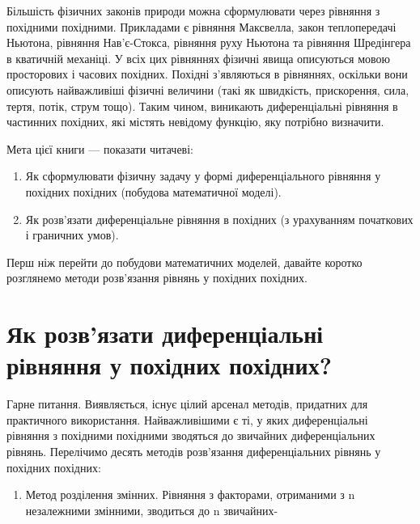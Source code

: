 \documentclass[
  ukrainian,
]{article}
\providecommand{\tightlist}{%
  \setlength{\itemsep}{0pt}\setlength{\parskip}{0pt}}
\begin{document}
Більшість фізичних законів природи можна сформулювати через рівняння з
похідними похідними. Прикладами є рівняння Максвелла, закон
теплопередачі Ньютона, рівняння Нав'є-Стокса, рівняння руху Ньютона та
рівняння Шредінгера в кватичній механіці. У всіх цих рівняннях фізичні
явища описуються мовою просторових і часових похідних. Похідні
з'являються в рівняннях, оскільки вони описують найважливіші фізичні
величини (такі як швидкість, прискорення, сила, тертя, потік, струм
тощо). Таким чином, виникають диференціальні рівняння в частинних
похідних, які містять невідому функцію, яку потрібно визначити.

Мета цієї книги --- показати читачеві:

\begin{enumerate}
\def\labelenumi{\arabic{enumi}.}
\item
  Як сформулювати фізичну задачу у формі диференціального рівняння у
  похідних похідних (побудова математичної моделі).
\item
  Як розв'язати диференціальне рівняння в похідних (з урахуванням
  початкових і граничних умов).
\end{enumerate}

Перш ніж перейти до побудови математичних моделей, давайте коротко
розглянемо методи розв'язання рівнянь у похідних похідних.

\section{Як розв'язати диференціальні рівняння у похідних
похідних?}\label{ux44fux43a-ux440ux43eux437ux432ux44fux437ux430ux442ux438-ux434ux438ux444ux435ux440ux435ux43dux446ux456ux430ux43bux44cux43dux456-ux440ux456ux432ux43dux44fux43dux43dux44f-ux443-ux43fux43eux445ux456ux434ux43dux438ux445-ux43fux43eux445ux456ux434ux43dux438ux445}

Гарне питання. Виявляється, існує цілий арсенал методів, придатних для
практичного використання. Найважливішими є ті, у яких диференціальні
рівняння з похідними похідними зводяться до звичайних диференціальних
рівнянь. Перелічимо десять методів розв'язання диференціальних рівнянь у
похідних похідних:

\begin{enumerate}
\def\labelenumi{\arabic{enumi}.}
\tightlist
\item
  Метод розділення змінних. Рівняння з факторами, отриманими з n
  незалежними змінними, зводиться до n звичайних-
\end{enumerate}
\end{document}
